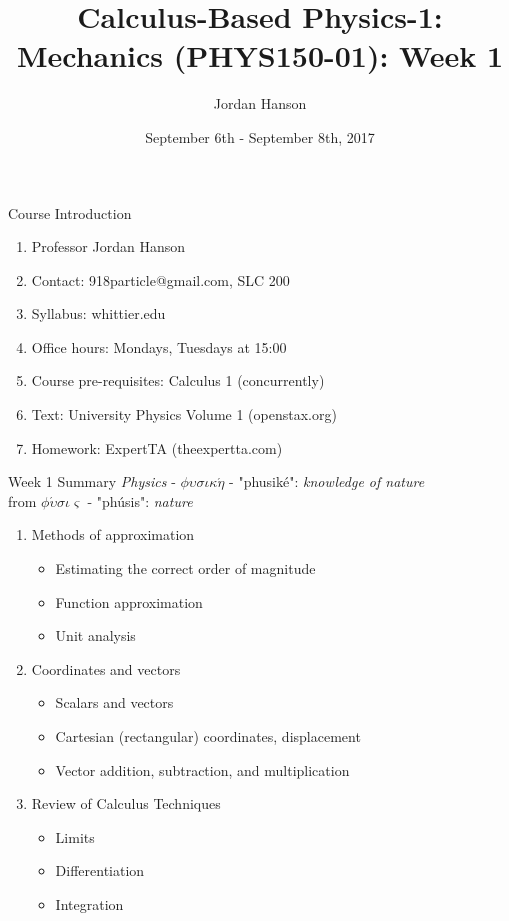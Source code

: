 \documentclass{beamer}
\title{Calculus-Based Physics-1: Mechanics (PHYS150-01): Week 1}
\date{September 6th - September 8th, 2017}
\author{Jordan Hanson}
\institute{Whittier College Department of Physics and Astronomy}
\begin{document}
\maketitle

\begin{frame}{Course Introduction}
\begin{enumerate}
\item Professor Jordan Hanson
\item Contact: 918particle@gmail.com, SLC 200
\item Syllabus: whittier.edu
\item Office hours: Mondays, Tuesdays at 15:00
\item Course pre-requisites: Calculus 1 (concurrently)
\item Text: University Physics Volume 1 (openstax.org)
\item Homework: ExpertTA (theexpertta.com)
\end{enumerate}
\end{frame}

\begin{frame}{Week 1 Summary}
\textit{Physics} - $\phi\upsilon\sigma\iota\kappa\acute{\eta}$ - "phusik\'e": \textit{knowledge of nature} \\
from $\phi\acute{\upsilon}\sigma\iota\varsigma$ - "ph\'usis": \textit{nature}
\begin{enumerate}
\item Methods of approximation
\begin{itemize}
\item \alert{Estimating} the correct order of magnitude
\item \alert{Function} approximation
\item \alert{Unit analysis}
\end{itemize}
\item Coordinates and vectors
\begin{itemize}
\item \alert{Scalars} and \alert{vectors}
\item \alert{Cartesian} (rectangular) coordinates, displacement
\item \alert{Vector} addition, subtraction, and multiplication
\end{itemize}
\item Review of Calculus Techniques
\begin{itemize}
\item Limits
\item Differentiation
\item Integration
\end{itemize}
\end{enumerate}
\end{frame}
\end{document}
